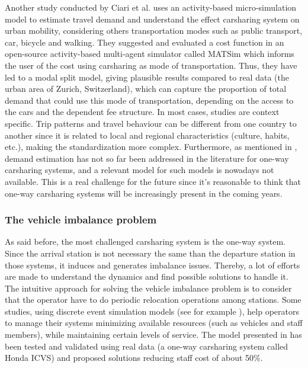 \begin{bibunit}[ieeetr]
\medskip
Another study conducted by Ciari et al. \cite{ciari_estimation_2013} uses an activity-based micro-simulation model to estimate travel demand and understand the effect carsharing system on urban mobility, considering others transportation modes such as public transport, car, bicycle and walking.
They suggested and evaluated a cost function in an open-source activity-based multi-agent simulator called MATSim \cite{matsim_webPage} which informs the user of the cost using carsharing as mode of transportation.
Thus, they have led to a modal split model, giving plausible results compared to real data (the urban area of Zurich, Switzerland), which can capture the proportion of total demand that could use this mode of transportation, depending on the access to the cars and the dependent fee structure.
In most cases, studies are context specific.
Trip patterns and travel behaviour can be different from one country to another since it is related to local and regional characteristics (culture, habits, etc.), making the standardization more complex.
Furthermore, as mentioned in \cite{jorge_carsharing_2013}, demand estimation has not so far been addressed in the literature for one-way carsharing systems, and a relevant model for such models is nowadays not available.
This is a real challenge for the future since it's reasonable to think that one-way carsharing systems will be increasingly present in the coming years.

\subsubsection{The vehicle imbalance problem}
As said before, the most challenged carsharing system is the one-way system. Since the arrival station is not necessary the same than the departure station in those systems, it induces and generates imbalance issues.
Thereby, a lot of efforts are made to understand the dynamics and find possible solutions to handle it.
The intuitive approach for solving the vehicle imbalance problem is to consider that the operator have to do periodic relocation operations among stations.
Some studies, using discrete event simulation models (see for example \cite{barth_simulation_1999, kek_relocation_2006, kek_decision_2009}), help operators to manage their systems minimizing available resources (such as vehicles and staff members), while maintaining certain levels of service.
The model presented in \cite{kek_decision_2009} has been tested and validated using real data (a one-way carsharing system called Honda ICVS) and proposed solutions reducing staff cost of about 50\%.


\end{bibunit}
